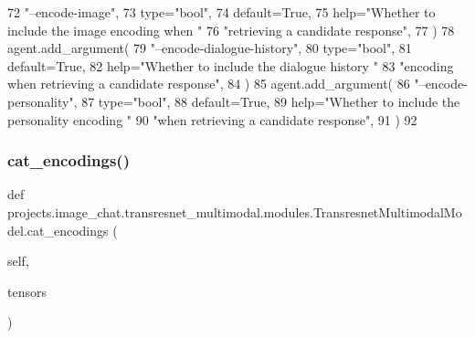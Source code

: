 \begin{DoxyCode}
72             \textcolor{stringliteral}{"--encode-image"},
73             type=\textcolor{stringliteral}{"bool"},
74             default=\textcolor{keyword}{True},
75             help=\textcolor{stringliteral}{"Whether to include the image encoding when "}
76             \textcolor{stringliteral}{"retrieving a candidate response"},
77         )
78         agent.add\_argument(
79             \textcolor{stringliteral}{"--encode-dialogue-history"},
80             type=\textcolor{stringliteral}{"bool"},
81             default=\textcolor{keyword}{True},
82             help=\textcolor{stringliteral}{"Whether to include the dialogue history "}
83             \textcolor{stringliteral}{"encoding when retrieving a candidate response"},
84         )
85         agent.add\_argument(
86             \textcolor{stringliteral}{"--encode-personality"},
87             type=\textcolor{stringliteral}{"bool"},
88             default=\textcolor{keyword}{True},
89             help=\textcolor{stringliteral}{"Whether to include the personality encoding "}
90             \textcolor{stringliteral}{"when retrieving a candidate response"},
91         )
92 
\end{DoxyCode}
\mbox{\label{classprojects_1_1image__chat_1_1transresnet__multimodal_1_1modules_1_1TransresnetMultimodalModel_aff6ec96c67c791d1adbc7ca4043805fc}} 
\subsubsection{\texorpdfstring{cat\+\_\+encodings()}{cat\_encodings()}}
{\footnotesize\ttfamily def projects.\+image\+\_\+chat.\+transresnet\+\_\+multimodal.\+modules.\+Transresnet\+Multimodal\+Model.\+cat\+\_\+encodings (\begin{DoxyParamCaption}\item[{}]{self,  }\item[{}]{tensors }\end{DoxyParamCaption})}

